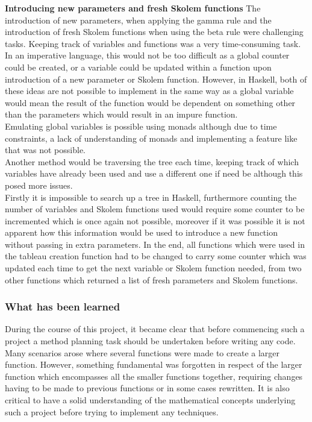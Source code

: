 \documentclass{article}%
\begin{document}
\textbf{Introducing new parameters and fresh Skolem functions}
The introduction of new parameters, when applying the gamma rule and the introduction of fresh Skolem functions when using the beta rule were challenging tasks. Keeping track of variables and functions was a very time-consuming task. In an imperative language, this would not be too difficult as a global counter could be created, or a variable could be updated within a function upon introduction of a new parameter or Skolem function. However, in Haskell, both of these ideas are not possible to implement in the same way as a global variable would mean the result of the function would be dependent on something other than the parameters which would result in an impure function.\\ 
Emulating global variables is possible using monads although due to time constraints, a lack of understanding of monads and implementing a feature like that was not possible. \\ 
Another method would be traversing the tree each time, keeping track of which variables have already been used and use a different one if need be although this posed more issues.\\
 Firstly it is impossible to search up a tree in Haskell, furthermore counting the number of variables and Skolem functions used would require some counter to be incremented which is once again not possible, moreover if it was possible it is not apparent how this information would be used to introduce a new function without passing in extra parameters. In the end, all functions which were used in the tableau creation function had to be changed to carry some counter which was updated each time to get the next variable or Skolem function needed, from two other functions which returned a list of fresh parameters and Skolem functions. 
\subsubsection{What has been learned}
During the course of this project, it became clear that before commencing such a project a method planning task should be undertaken before writing any code. Many scenarios arose where several functions were made to create a larger function. However, something fundamental was forgotten in respect of the larger function which encompasses all the smaller functions together, requiring changes having to be made to previous functions or in some cases rewritten. It is also critical to have a solid understanding of the mathematical concepts underlying such a project before trying to implement any techniques. 
\end{document}
